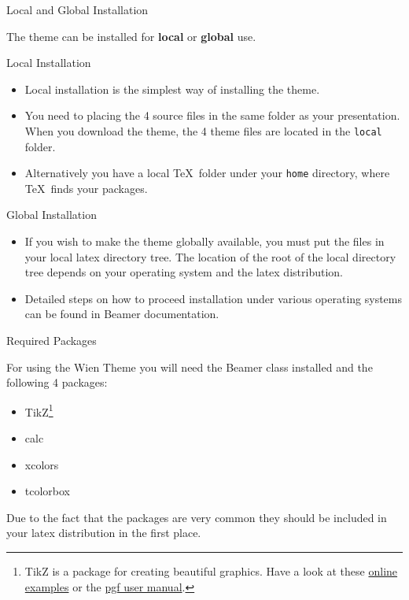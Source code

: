 \begin{frame}{Local and Global Installation}
  
  The theme can be installed for \textbf{local} or \textbf{global} use.
  \begin{block}{Local Installation}
  \begin{itemize}    
    \item Local installation is the simplest way of installing the theme. 
    \item You need to placing the 4 source files in the same folder as
      your presentation. When you download the theme, the 4 theme
      files are located in the {\tt local} folder.
    \item Alternatively you have a local \TeX\  folder under your \texttt{home}
      directory, where \TeX\  finds your packages.
  \end{itemize}
  \end{block}

  \begin{block}{Global Installation}
  \begin{itemize}
     \item If you wish to make the theme globally available, you must
       put the files in your local latex directory tree. The location
       of the root of the local directory tree depends on your
       operating system and the latex distribution.
     \item Detailed steps on how to proceed installation under various
       operating systems can be found in Beamer documentation.
  \end{itemize}
  \end{block}
\end{frame}

\begin{frame}{Required Packages}
  \begin{block}{}
    For using the Wien Theme you will need the Beamer class installed
    and the following 4 packages:
    \begin{itemize}
    \item TikZ\footnote{TikZ is a package for creating beautiful
        graphics. Have a look at these
        \href{http://www.texample.net/tikz/examples/}{online examples}
        or the
        \href{http://tug.ctan.org/tex-archive/graphics/pgf/base/doc/generic/pgf/pgfmanual.pdf}{pgf
          user manual}.}
    \item calc
    \item xcolors
    \item tcolorbox
    \end{itemize}
    Due to the fact that the packages are very common they should be
    included in your latex distribution in the first place.
  \end{block}
  \end{frame}

